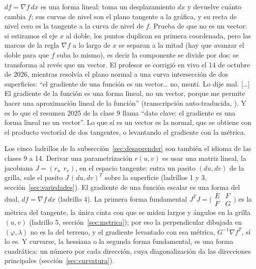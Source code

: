\begin{atencion}
\(df=\nabla f\,dx\) es una forma lineal: toma un desplazamiento \(dx\) y devuelve cuánto
cambia \(f\); sus curvas de nivel son el plano tangente a la gráfica, y su recta de nivel
cero es la tangente a la curva de nivel de \(f\). Prueba de que no es un vector: si
estiramos el eje \(x\) al doble, los puntos duplican su primera coordenada, pero las marcas
de la regla \(\nabla f\) a lo largo de \(x\) se separan a la mitad (hay que avanzar el
doble para que \(f\) suba lo mismo), es decir la componente se divide por dos: se
transforma al revés que un vector. El profesor se corrigió en vivo el 14 de octubre de
2026, mientras resolvía el plano normal a una curva intersección de dos superficies: ``el
gradiente de una función es un vector\ldots{} no, mentí. Lo dije mal. [\ldots] El gradiente
de la función es una forma lineal, no un vector, porque me permite hacer una aproximación
lineal de la función'' (transcripción auto-traducida, ).
Y es lo que el resumen 2025 de la clase 9 llama ``dato clave: el gradiente es una forma
lineal no un vector''. Lo que sí es un vector es la normal, que se obtiene con el producto
vectorial de dos tangentes, o levantando el gradiente con la métrica.
\end{atencion}

\begin{resultado}
Los cinco ladrillos de la subsección~\ref{sec:desaprender} son también el idioma de las
clases 9 a 14. Derivar una parametrización \(r(u,v)\) es usar una matriz lineal, la
jacobiana \(J=(r_u\ \ r_v)\), en el espacio tangente: entra un pasito \((du,dv)\) de la
grilla, sale el pasito \(J\,(du,dv)^T\) sobre la superficie (ladrillos 1 y 3,
sección~\ref{sec:variedades}). El gradiente de una función escalar es una forma del dual,
\(df=\nabla f\,dx\) (ladrillo 4). La primera forma fundamental \(J^TJ=
\bigl(\begin{smallmatrix}E&F\\ F&G\end{smallmatrix}\bigr)\) es la métrica del tangente,
la única cinta con que se miden largos y ángulos en la grilla \((u,v)\) (ladrillo 5,
sección~\ref{sec:metrica}); por eso la perpendicular dibujada en \((\varphi,\lambda)\) no
es la del terreno, y el gradiente levantado con esa métrica, \(G^{-1}\nabla f^{T}\), sí lo
es. Y curvarse, la hessiana o la segunda forma fundamental, es una forma cuadrática: un
número por cada dirección, cuya diagonalización da las direcciones principales
(sección~\ref{sec:curvatura}).
\end{resultado}
